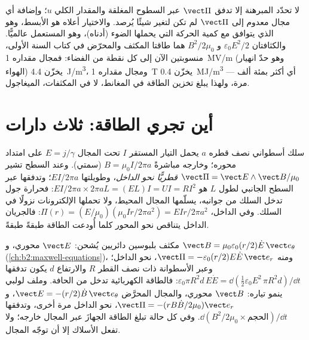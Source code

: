 \begin{remark}\label{rem:b2:poynting-vector:interpretation}
لا تحدّد المبرهنة إلا تدفق $\vect\Pi$ عبر السطوح المغلقة
والمقدار الكلي $u$؛ وإضافة أي مجال معدوم  إلى $\vect\Pi$ لم تكن
لتغير شيئًا يُرصد. والاختيار أعلاه هو الأبسط، وهو
الذي يتوافق مع كمية الحركة التي يحملها الضوء (أدناه)، وهو
المستعمل عالميًّا. والكثافتان $\varepsilon_0E^2/2$ و $B^2/2\mu_0$ هما
طاقتا المكثف والمحرّض في كتاب السنة الأولى،
منسوبتين الآن إلى كل نقطة من الفضاء: فمجال مقداره \qty{1}{MV/m} (وهو
حدّ انهيار الهواء) يخزّن \qty{4.4}{J/m^3}، ومجال مقداره \qty{1}{T}
يخزّن \qty{0.4}{MJ/m^3} --- أي أكثر بمئة ألف مرة، ولهذا يبلغ
تخزين الطاقة في المغانط، لا في المكثفات، الميغاجول.
\end{remark}

\section{أين تجري الطاقة: ثلاث دارات}

\begin{example}\label{ex:b2:poynting-vector:wire}
سلك أسطواني نصف قطره $a$ يحمل التيار المستقر $I$ تحت
المجال $E = j/\gamma$ على امتداد محوره؛ وخارجه مباشرةً $B = \mu_0I/2\pi a$
(سمتي). وعند السطح تشير $\vect\Pi = \vect E\wedge\vect B/\mu_0$
\emph{قطريًّا نحو الداخل}، وطويلتها $EI/2\pi a$؛ وتدفقها عبر
السطح الجانبي لطول $L$ هو $EI/2\pi a\times2\pi aL = (EL)I = UI =
RI^2$: فحرارة جول تدخل السلك من جوانبه، يسلّمها
المجال المحيط، ولا تحملها الإلكترونات نزولًا في السلك.
وفي الداخل، $\Pi(r) = (E/\mu_0)(\mu_0Ir/2\pi a^2) = EIr/2\pi a^2$: فالجريان الداخل
يتناقص نحو المحور كلما أُودعت الطاقة طبقةً طبقةً.
\end{example}

\begin{example}\label{ex:b2:poynting-vector:capsol}
مكثف بلبوسين دائريين يُشحن: $\vect E$ محوري، و $\vect B =
\mu_0\varepsilon_0(r/2)\dot E\,\vect e_\theta$ (\cref{ch:b2:maxwell-equations})، ومنه
$\vect\Pi = -\varepsilon_0(r/2)E\dot E\,\vect e_r$، نحو الداخل؛ وعبر الأسطوانة ذات
نصف القطر $R$ والارتفاع $d$ يكون تدفقها $\varepsilon_0\pi R^2d\,E\dot E = \dd(\tfrac12
\varepsilon_0E^2\,\pi R^2d)/\dd t$: فالطاقة الكهربائية تدخل من الحافة. وملف
لولبي ينمو تياره: $\vect B$ محوري، والمجال المحرَّض $\vect E = -(r/2)
\dot B\,\vect e_\theta$، و $\vect\Pi = -(rB\dot B/2\mu_0)\vect e_r$، نحو الداخل مرة أخرى، وتدفقها
$\dd(B^2/2\mu_0\times\text{الحجم})/\dd t$. وفي كل حالة تبلغ الطاقة
الجهازَ عبر المجال خارجه؛ ولا تفعل الأسلاك إلا أن توجّه
المجال.
\end{example}

